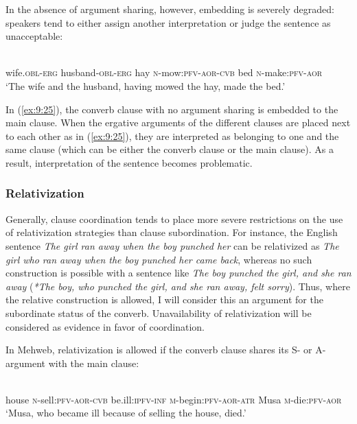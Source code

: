﻿\documentclass[output=paper]{langsci/langscibook}
\begin{document}
In the absence of argument sharing, however, embedding is severely
degraded: speakers tend to either assign another interpretation or judge
the sentence as unacceptable:

\ea \label{ex:9:25} %
\\
wife.\textsc{obl}-\textsc{erg} husband-\textsc{obl}-\textsc{erg} hay \textsc{n}-mow:\textsc{pfv}-\textsc{aor}-\textsc{cvb} bed \textsc{n}-make:\textsc{pfv}-\textsc{aor}\\
\glt `The wife and the husband, having mowed the hay, made the bed.'
\z

In (\ref{ex:9:25}), the converb clause with no argument sharing is embedded to
the main clause. When the ergative arguments of the different clauses
are placed next to each other as in (\ref{ex:9:25}), they are interpreted as
belonging to one and the same clause (which can be either the converb
clause or the main clause). As a result, interpretation of the sentence becomes problematic.
%

\subsubsection{Relativization}\label{relativization}


Generally, clause coordination tends to place more severe
restrictions on the use of relativization strategies than clause
subordination. For instance, the English sentence \emph{The girl ran away when the boy punched her} 
can be relativized as \emph{The girl who ran away when the boy 
punched her came back}, whereas no such construction is
possible with a sentence like \emph{The boy punched the girl, and she ran away} 
(\emph{*The boy, who punched the girl, and she ran away, felt sorry}). 
Thus, where the relative construction is allowed, I
will consider this an argument for the subordinate status of the
converb. Unavailability of relativization will be considered as evidence
in favor of coordination.

In Mehweb, relativization is allowed if the converb clause shares its S-
or A-argument with the main clause:

\ea \label{ex:9:26} %
\\
house \textsc{n}-sell:\textsc{pfv}-\textsc{aor}-\textsc{cvb} be.ill:\textsc{ipfv}-\textsc{inf} \textsc{m}-begin:\textsc{pfv}-\textsc{aor}-\textsc{atr} Musa \textsc{m}-die:\textsc{pfv}-\textsc{aor}\\
\glt
`Musa, who became ill because of selling the house, died.'
\z
\end{document}
